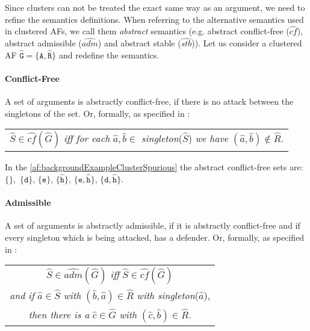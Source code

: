 Since clusters can not be treated the exact same way as an argument, we need to refine the semantics definitions. When referring to the alternative semantics used in clustered AFs, we call them \emph{abstract} semantics (e.g. abstract conflict-free ($\hat{cf}$), abstract admissible ($\hat{adm}$) and abstract stable ($\hat{stb}$)). Let us consider a clustered AF $\mathtt{\hat{G}=\{\hat{A}, \hat{R}\}}$ and redefine the semantics.

\paragraph{Conflict-Free} A set of arguments is abstractly conflict-free, if there is no attack between the singletons of the set. Or, formally, as specified in \cite{DBLP:conf/kr/SaribaturW21}:

\begin{center}
    \begin{tabular}{c}
        $\hat{S} \in \hat{cf}(\hat{G})$ \textit{iff for each} $\hat{a}, \hat{b} \in$ \textit{singleton}($\hat{S}$) \textit{we have} $(\hat{a}, \hat{b}) \not\in \hat{R}$.
    \end{tabular}
\end{center}

In the \cref{af:backgroundExampleClusterSpurious} the abstract conflict-free sets are:
$\mathtt{\{\}},$
$\mathtt{\{d}\}$,
$\mathtt{\{e}\}$,
$\mathtt{\{\hat{h}}\}$,
$\mathtt{\{e, \hat{h}}\}$,
$\mathtt{\{d, \hat{h}}\}$.



\paragraph{Admissible} A set of arguments is abstractly admissible, if it is abstractly conflict-free and if every singleton which is being attacked, has a defender. Or, formally, as specified in \cite{DBLP:conf/kr/SaribaturW21}:

\begin{center}
    \begin{tabular}{c}
        $\hat{S} \in \hat{adm}(\hat{G})$ \textit{iff} $\hat{S} \in \hat{cf}(\hat{G})$\\

        \textit{and if} $\hat{a} \in \hat{S}$ \textit{with} $(\hat{b}, \hat{a}) \in \hat{R}$ \textit{with singleton}($\hat{a}$),\\

        \textit{then there is a} $\hat{c} \in \hat{G}$ \textit{with} $(\hat{c}, \hat{b}) \in \hat{R}$.
    \end{tabular}
\end{center}

